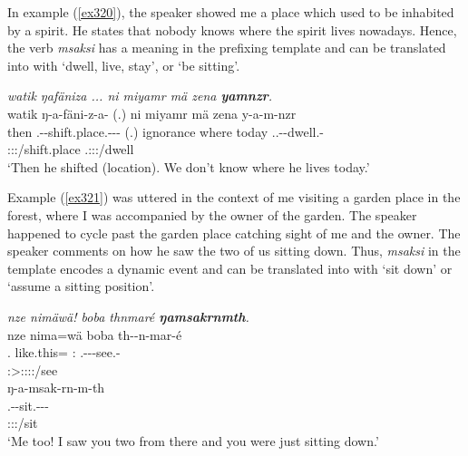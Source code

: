 In example (\ref{ex320}), the speaker showed me a place which used to be inhabited by a spirit. He states that nobody knows where the spirit lives nowadays. Hence, the verb \emph{msaksi} has a  meaning in the prefixing template and can be translated into  with `dwell, live, stay', or `be sitting'.

\begin{exe}
	\ex \emph{watik ŋafäniza ... ni miyamr mä zena \textbf{yamnzr}.}\\
	\glll watik ŋ-a-fäni-z-a-\Zero{} (.) ni miyamr mä zena y-a-m-nzr\\
	then \M.\Alph{}-\Vc-shift.place.\Ext-\Ndu-\Pst-\Stsg{} (.) \Fnsg{} ignorance where today \Tsg.\Masc.\Alph-\Vc-dwell.\Ext-\Ndu\\
	{} \footnotesize{\Stsg:\Sbj:\Ipfv:\Pst/shift.place} {} {} {} {} {} \footnotesize{\Tsg.\Masc:\Sbj:\Nonpast:\Ipfv/dwell}\\
	\trans `Then he shifted (location). We don't know where he lives today.'\\
	\label{ex320}
\end{exe}

Example (\ref{ex321}) was uttered in the context of me visiting a garden place in the forest, where I was accompanied by the owner of the garden. The speaker happened to cycle past the garden place catching sight of me and the owner. The speaker comments on how he saw the two of us sitting down. Thus, \emph{msaksi} in the  template encodes a dynamic event and can be translated into  with `sit down' or `assume a sitting position'.

\begin{exe}
	\ex \emph{nze nimäwä! boba thnmaré \textbf{ŋamsakrnmth}.}\\
	\glll nze nima=wä boba th-\Zero{}-n-mar-é\\
	\Fsg.\Erg{} like.this=\Emph{} \Med:\Abl{} \Stnsg.\Gam-\Du-\Venit-see.\Rs-\Fsg{}\\
	{} {} {} \footnotesize{\Fsg:\Sbj>\Stdu:\Obj:\Rpst:\Pfv:\Venit/see}\\
	\sn
	\glll ŋ-a-msak-rn-m-th\\
	\M.\Alph-\Vc-sit.\Ext-\Du-\Dur-\Stnsg{}\\
	\footnotesize{\Stdu:\Sbj:\Rpst:\Dur/sit}\\
	\trans `Me too! I saw you two from there and you were just sitting down.'\\
	\label{ex321}
\end{exe}

